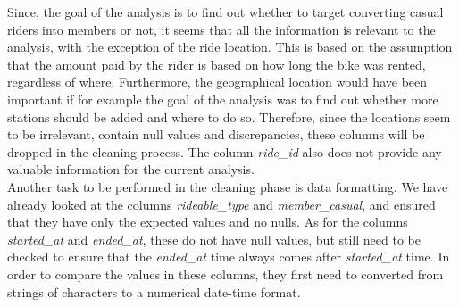 \documentclass[12pt]{article}
\begin{document}
Since, the goal of the analysis is to find out whether to target converting casual riders into members or not, it seems that all the information is relevant to the analysis, with the exception of the ride location. This is based on the assumption that the amount paid by the rider is based on how long the bike was rented, regardless of where. Furthermore, the geographical location would have been important if for example the goal of the analysis was to find out whether more stations should be added and where to do so. Therefore, since the locations seem to be irrelevant, contain null values and discrepancies, these columns will be dropped in the cleaning process. The column \textit{ride\_id} also does not provide any valuable information for the current analysis. \\

Another task to be performed in the cleaning phase is data formatting. We have already looked at the columns \textit{rideable\_type} and \textit{member\_casual}, and ensured that they have only the expected values and no nulls. As for the columns \textit{started\_at} and \textit{ended\_at}, these do not have null values, but still need to be checked to ensure that the \textit{ended\_at} time always comes after \textit{started\_at} time. In order to compare the values in these columns, they first need to converted from strings of characters to a numerical date-time format. \\
\end{document}
